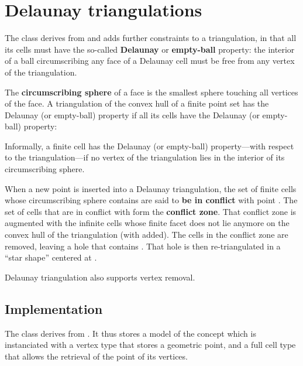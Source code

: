 
\section{Delaunay triangulations}%

The class  derives from
 and adds further constraints to a
triangulation, in that all its cells must have the so-called
\textbf{Delaunay} or \textbf{empty-ball} property: the interior of a ball
circumscribing any face of a Delaunay cell must be free from any vertex
of the triangulation.

The \textbf{circumscribing sphere} of a face  is the smallest sphere
touching all vertices of the face. A triangulation of the convex
hull of a finite point set has the Delaunay (or empty-ball) property if all
its cells have the Delaunay (or empty-ball) property:

Informally, a finite cell has the Delaunay (or empty-ball) property---with
respect to the triangulation---if no vertex of the triangulation lies in the
interior of its circumscribing sphere.

When a new point  is inserted into a Delaunay triangulation, the set of
finite cells whose circumscribing sphere contains  are said to
\textbf{be in conflict} with point . The set of cells that are in
conflict with  form the \textbf{conflict zone}. That conflict zone is
augmented with the infinite cells whose finite facet does not lie
anymore on the convex hull of the triangulation (with  added). The cells
in the conflict zone are removed, leaving a hole that contains . That
hole is then re-triangulated in a ``star shape'' centered at .

Delaunay triangulation also supports vertex removal.


\subsection{Implementation}

The class  derives from
. It thus stores a model  of
the concept  which is instanciated with a vertex
type that stores a geometric point, and a full cell type that allows the
retrieval of the point of its vertices.

